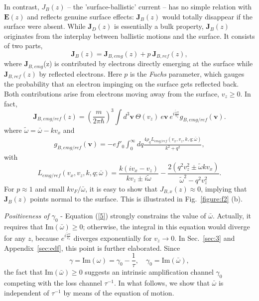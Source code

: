 \documentclass[aps,reprint]{revtex4-1}
\begin{document}
In contrast, $J_B(z)$ -- the 'surface-ballistic' current -- has no simple relation with $\mathbf{E}(z)$ and reflects genuine surface effects: $\mathbf{J}_B(z)$ would totally disappear if the surface were absent. While $\mathbf{J}_D(z)$ is essentially a bulk property, $\mathbf{J}_B(z)$ originates from the interplay between ballistic motions and the surface. It consists of two parts, $$\mathbf{J}_B(z) = \mathbf{J}_{B,emg}(z) + p~\mathbf{J}_{B,ref}(z),$$ where $\mathbf{J}_{B,emg}$(z) is contributed by electrons directly emerging at the surface while $\mathbf{J}_{B,ref}(z)$ by reflected electrons. Here $p$ is the \textit{Fuchs} parameter, which gauges the probability that an electron impinging on the surface gets reflected back. Both contributions arise from electrons moving away from the surface, $v_z\geq 0$. In fact, 
\begin{equation}
\mathbf{J}_{B,emg/ref}(z) = \left(\frac{m}{2\pi\hbar}\right)^3\int d^3\mathbf{v}~\Theta(v_z)~e\mathbf{v}~e^{i\frac{\tilde{\omega}z}{v_z}} g_{B,emg/ref}(\mathbf{v}). \label{5}
\end{equation}
where $\tilde{\omega} = \bar{\omega} - kv_x$ and 
\begin{eqnarray}
g_{B,emg/ref}(\mathbf{v}) = -ef'_0 \int^{\infty}_{0} dq\frac{4\rho_qL_{emg/ref}(v_x,v_z,k,q;\bar{\omega})}{k^2+q^2}, \label{g}
\end{eqnarray}
with $$L_{emg/ref}(v_x,v_z,k,q;\bar{\omega}) = \frac{k(iv_x-v_z)}{kv_z\pm i\tilde{\omega}}-\frac{2(q^2v^2_z\pm \tilde{\omega}kv_x)}{\tilde{\omega}^2-q^2v^2_z}.$$
For $p\approx 1$ and small $kv_F/\bar{\omega}$, it is easy to show that $J_{B,x}(z) \approx 0$, implying that $\mathbf{J}_{B}(z)$ points normal to the surface. This is illustrated in Fig.~\ref{figure:f2} (b). 

\textit{Positiveness of $\gamma_0$} - Equation (\ref{5}) strongly constrains the value of $\bar{\omega}$. Actually, it requires that Im$(\bar{\omega})\geq 0$; otherwise, the integral in this equation would diverge for any $z$, because $e^{i\frac{\tilde{\omega}z}{v_z}}$ diverges exponentially for $v_z\rightarrow 0$. In Sec.~\ref{sec:3} and Appendix~\ref{sec:edf}, this point is further elaborated. Since 
\begin{equation}
\gamma = \mbox{Im}(\omega) = \gamma_0 - \frac{1}{\tau}, \quad \gamma_0=\mbox{Im}(\bar{\omega}),
\end{equation}
the fact that Im$(\bar{\omega})\geq 0$ suggests an intrinsic amplification channel $\gamma_0$ competing with the loss channel $\tau^{-1}$. In what follows, we show that $\bar{\omega}$ is independent of $\tau^{-1}$ by means of the equation of motion. 
\end{document}
